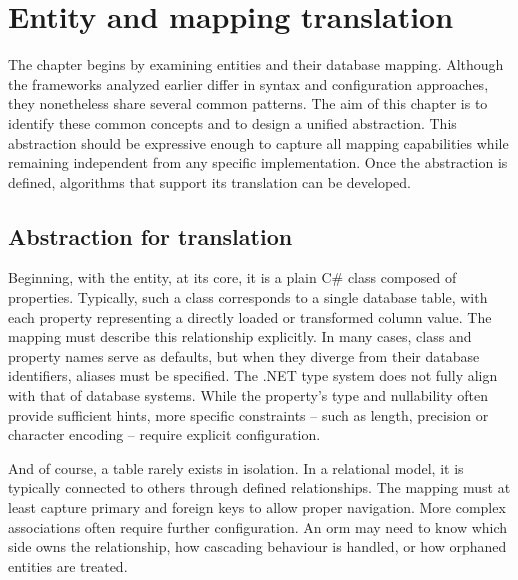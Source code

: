 \chapter{Entity and mapping translation}\label{chapter:entity_translation}

The chapter begins by examining entities and their database mapping. Although the frameworks analyzed earlier differ in syntax and configuration approaches, they nonetheless share several common patterns. The aim of this chapter is to identify these common concepts and to design a unified abstraction. This abstraction should be expressive enough to capture all mapping capabilities while remaining independent from any specific implementation. Once the abstraction is defined, algorithms that support its translation can be developed.

\section{Abstraction for translation}\label{sec:def_abstract}

Beginning, with the entity, at its core, it is a plain C\# class composed of properties. Typically, such a class corresponds to a single database table, with each property representing a directly loaded or transformed column value. The mapping must describe this relationship explicitly. In many cases, class and property names serve as defaults, but when they diverge from their database identifiers, aliases must be specified. The .NET type system does not fully align with that of database systems. While the property's type and nullability often provide sufficient hints, more specific constraints -- such as length, precision or character encoding -- require explicit configuration.

And of course, a table rarely exists in isolation. In a relational model, it is typically connected to others through defined relationships. The mapping must at least capture primary and foreign keys to allow proper navigation. More complex associations often require further configuration. An \acrshort{orm} may need to know which side owns the relationship, how cascading behaviour is handled, or how orphaned entities are treated.

